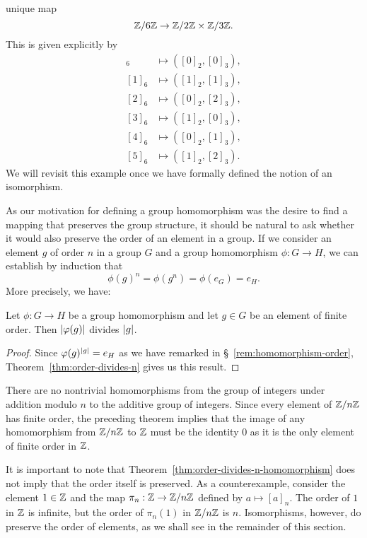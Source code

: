 \begin{example}
    unique map
    \[
        \mathbb{Z}/6\mathbb{Z} \to \mathbb{Z}/2\mathbb{Z} \times \mathbb{Z}/3\mathbb{Z}.
    \]
    This is given explicitly by
    \begin{align*}
        [0]_6 & \mapsto ([0]_2, [0]_3),\\
        [1]_6 & \mapsto ([1]_2, [1]_3),\\
        [2]_6 & \mapsto ([0]_2, [2]_3),\\
        [3]_6 & \mapsto ([1]_2, [0]_3),\\
        [4]_6 & \mapsto ([0]_2, [1]_3),\\
        [5]_6 & \mapsto ([1]_2, [2]_3).
    \end{align*}
    We will revisit this example once we have formally defined the notion of an
    isomorphism.
\end{example}

\bigskip

\label{rem:homomorphism-order}
As our motivation for defining a group homomorphism was the desire to find a
mapping that preserves the group structure, it should be natural to ask whether
it would also preserve the order of an element in a group. If we consider an
element \(g\) of order \(n\) in a group \(G\) and a group homomorphism \(\phi: G
\to H\), we can establish by induction that
\[
    \phi(g)^n = \phi(g^n) = \phi(e_G) = e_H.
\]
More precisely, we have:

\begin{theorem}
    \label{thm:order-divides-n-homomorphism}
    Let \(\phi: G \to H\) be a group homomorphism and let \(g \in G\) be an
    element of finite order. Then \(\lvert \varphi(g) \rvert\) divides \(\lvert g \rvert\).
\end{theorem}

\begin{proof}
    Since \(\varphi(g)^{\lvert g \rvert} = e_H\) as we have remarked in
    \S~\ref{rem:homomorphism-order}, Theorem~\ref{thm:order-divides-n} gives us
    this result.
\end{proof}

\begin{example}
    There are no nontrivial homomorphisms from the group of integers under
    addition modulo \(n\) to the additive group of integers. Since every element
    of \(\mathbb{Z}/n\mathbb{Z}\) has finite order, the preceding theorem implies that the image
    of any homomorphism from \(\mathbb{Z}/n\mathbb{Z}\) to \(\mathbb{Z}\) must be the identity \(0\) as
    it is the only element of finite order in \(\mathbb{Z}\).
\end{example}

\begin{example}
    It is important to note that Theorem~\ref{thm:order-divides-n-homomorphism}
    does not imply that the order itself is preserved. As a counterexample,
    consider the element \(1 \in \mathbb{Z}\) and the map \(\pi_n : \mathbb{Z} \to \mathbb{Z}/n\mathbb{Z}\)
    defined by \(a \mapsto [a]_n\). The order of \(1\) in \(\mathbb{Z}\) is infinite,
    but the order of \(\pi_n(1)\) in \(\mathbb{Z}/n\mathbb{Z}\) is \(n\). Isomorphisms, however,
    do preserve the order of elements, as we shall see in the remainder of this
    section.
\end{example}

